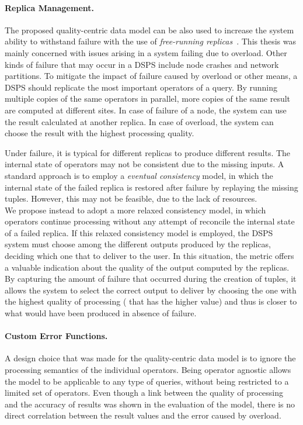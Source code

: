 \paragraph{Replica Management.}
The proposed quality-centric data model can be also used to increase the system ability to withstand
failure with the use of \emph{free-running replicas}~\cite{dependable-is-sensing}. This thesis was mainly
concerned with issues arising in a system failing due to overload. Other kinds of failure that may occur
in a DSPS include node crashes and network partitions. To mitigate the impact of failure caused by
overload or other means, a DSPS should replicate the most important operators of a query. By running
multiple copies of the same operators in parallel, more copies of the same result are computed at
different sites. In case of failure of a node, the system can use the result calculated at another
replica. In case of overload, the system can choose the result with the highest processing quality.

Under failure, it is typical for different replicas to produce different results. The internal state
of operators may not be consistent due to the missing inputs. A standard approach is to employ a
\emph{eventual consistency} model, in which the internal state of the failed replica is restored after
failure by replaying the missing tuples. However, this may not be feasible, due to
the lack of resources.\\
We propose instead to adopt a more relaxed consistency model, in which operators continue processing
without any attempt of reconcile the internal state of a failed replica.
If this relaxed consistency model is employed, the DSPS system must choose among the different outputs
produced by the replicas, deciding which one that to deliver to the user. In this situation, the \sic
metric offers a valuable indication about the quality of the output computed by the replicas. By
capturing the amount of failure that occurred during the creation of tuples, it allows the system to
select the correct output to deliver by choosing the one with the highest quality of processing (\ie
that has the higher \sic value) and thus is closer to what would have been produced in absence of
failure.

\paragraph{Custom Error Functions.}
A design choice that was made for the quality-centric data model is to ignore the processing semantics of
the individual operators. Being operator agnostic allows the model to be applicable to any type of
queries, without being restricted to a limited set of operators. Even though a link between the quality of
processing and the accuracy of results was shown in the evaluation of the model, there is no direct
correlation between the result \sic values and the error caused by overload.

